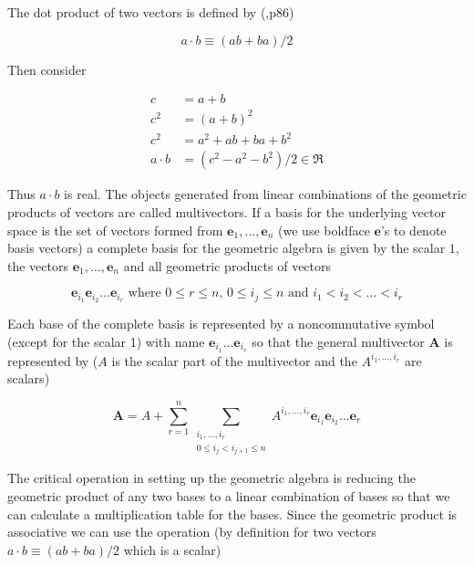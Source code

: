 \documentclass[12pt]{report}
\newcommand{\bm}[1]{\boldsymbol{#1}}
\newcommand{\eb}{\bm{e}}
\begin{document}
The dot product of two vectors is defined by (\cite{Doran},p86)

  \begin{equation}
     a\cdot b \equiv (ab+ba)/2
  \end{equation}

Then consider

  \begin{align}
     c &= a+b \\
     c^{2} &= (a+b)^{2} \\
     c^{2} &= a^{2}+ab+ba+b^{2} \\
     a\cdot b &= (c^{2}-a^{2}-b^{2})/2 \in \Re
  \end{align}

Thus $a\cdot b$  is real.  The objects generated from linear combinations
of the geometric products of vectors are called multivectors.  If a basis for
the underlying vector space is the set of vectors formed from $\eb_{1},\dots,\eb_{n}$ (we use
boldface $\eb$'s to denote basis vectors)
a complete basis for the geometric algebra is given by the scalar $1$, the vectors $\eb_{1},\dots,\eb_{n}$
and all geometric products of vectors

   \begin{equation}
      \eb_{i_{1}}\eb_{i_{2}}\dots \eb_{i_{r}} \mbox{ where } 0\le r \le n\mbox{, }0 \le i_{j} \le n \mbox{ and } i_{1}<i_{2}<\dots<i_{r}
   \end{equation}

Each base of the complete basis is represented by a noncommutative symbol (except for the scalar 1)
with name $\eb_{i_{1}}\dots \eb_{i_{r}}$ so that the general multivector $\bm{A}$ is represented by
($A$ is the scalar part of the multivector and the $A^{i_{1},\dots,i_{r}}$ are scalars)

   \begin{equation}
      \bm{A} = A + \sum_{r=1}^{n}\sum_{\substack{i_{1},\dots,i_{r}\\ 0\le i_{j}<i_{j+1} \le n}} 
               A^{i_{1},\dots,i_{r}}\eb_{i_{1}}\eb_{i_{2}}\dots \eb_{r}
   \end{equation}

The critical operation in setting up the geometric algebra is reducing
the geometric product of any two bases to a linear combination of bases so that
we can calculate a multiplication table for the bases.  Since the geometric
product is associative we can use the operation (by definition for two vectors
$a\cdot b \equiv (ab+ba)/2$  which is a scalar)
\end{document}
